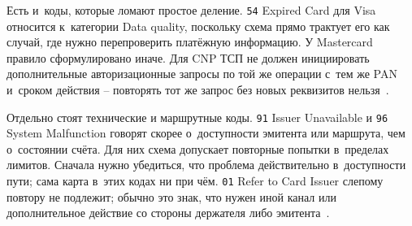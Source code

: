 Есть и~коды, которые ломают простое деление. \texttt{54} Expired Card для
Visa относится к~категории Data quality, поскольку схема прямо трактует
его как случай, где нужно перепроверить платёжную информацию. У
Mastercard правило сформулировано иначе. Для CNP ТСП не
должен инициировать дополнительные авторизационные запросы по той же
операции с~тем же PAN и~сроком действия -- повторять тот же запрос без новых реквизитов
нельзя~\cite{visa-core-rules,mc-tpr}.

Отдельно стоят технические и маршрутные коды. \texttt{91} Issuer
Unavailable и \texttt{96} System Malfunction говорят скорее о~доступности
эмитента или маршрута, чем о~состоянии счёта. Для них схема допускает
повторные попытки в~пределах лимитов. Сначала нужно убедиться, что
проблема действительно в~доступности пути; сама карта в~этих
кодах ни при чём. \texttt{01} Refer to Card Issuer слепому повтору
не подлежит; обычно это знак, что нужен иной канал или дополнительное
действие со стороны держателя либо эмитента~\cite{visa-core-rules}.

